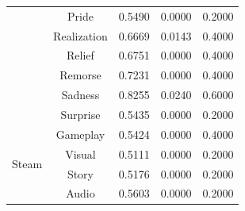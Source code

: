 \begin{table}[htbp]
\begin{tabular}{lcccc}
    & Pride & 0.5490 & 0.0000 & 0.2000 \\
    & Realization & 0.6669 & 0.0143 & 0.4000 \\
    & Relief & 0.6751 & 0.0000 & 0.4000 \\
    & Remorse & 0.7231 & 0.0000 & 0.4000 \\
    & Sadness & 0.8255 & 0.0240 & 0.6000 \\
    & Surprise & 0.5435 & 0.0000 & 0.2000 \\
    \midrule
    \multirow{4}{*}{Steam} & Gameplay & 0.5424 & 0.0000 & 0.4000 \\
    & Visual & 0.5111 & 0.0000 & 0.2000 \\
    & Story & 0.5176 & 0.0000 & 0.2000 \\
    & Audio & 0.5603 & 0.0000 & 0.2000 \\
    \bottomrule
  \end{tabular}
\end{table}

